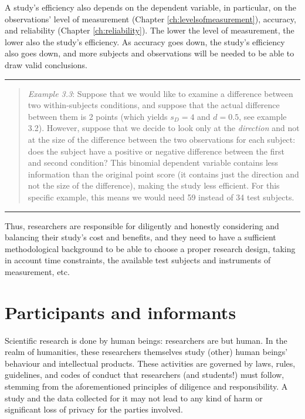 \documentclass[
]{book}
\begin{document}
A study's efficiency also depends on the dependent variable, in particular, on the observations' level of measurement (Chapter \ref{ch:levelsofmeasurement}), accuracy, and reliability (Chapter \ref{ch:reliability}). The lower the level of measurement, the lower also the study's efficiency. As accuracy goes down, the study's efficiency also goes down, and more subjects and observations will be needed to be able to draw valid conclusions.

\begin{center}\rule{0.5\linewidth}{0.5pt}\end{center}

\begin{quote}
\emph{Example 3.3}: Suppose that we would like to examine a difference between two within-subjects conditions, and suppose that the actual difference between them is 2 points (which yields \(s_D = 4\) and \(d = 0.5\), see example 3.2). However, suppose that we decide to look only at the \emph{direction} and not at the size of the difference between the two observations for each subject: does the subject have a positive or negative difference between the first and second condition? This binomial dependent variable contains less information than the original point score (it contains just the direction and not the size of the difference), making the study less efficient. For this specific example, this means we would need 59 instead of 34 test subjects.
\end{quote}

\begin{center}\rule{0.5\linewidth}{0.5pt}\end{center}

Thus, researchers are responsible for diligently and honestly considering and balancing their study's cost and benefits, and they need to have a sufficient methodological background to be able to choose a proper research design, taking in account time constraints, the available test subjects and instruments of measurement, etc.

\hypertarget{participants-and-informants}{%
\section{Participants and informants}\label{participants-and-informants}}

Scientific research is done by human beings: researchers are but human. In the realm of humanities, these researchers themselves study (other) human beings' behaviour and intellectual products. These activities are governed by laws, rules, guidelines, and codes of conduct that researchers (and students!) must follow, stemming from the aforementioned principles of diligence and responsibility. A study and the data collected for it may not lead to any kind of harm or significant loss of privacy for the parties involved.
\end{document}
